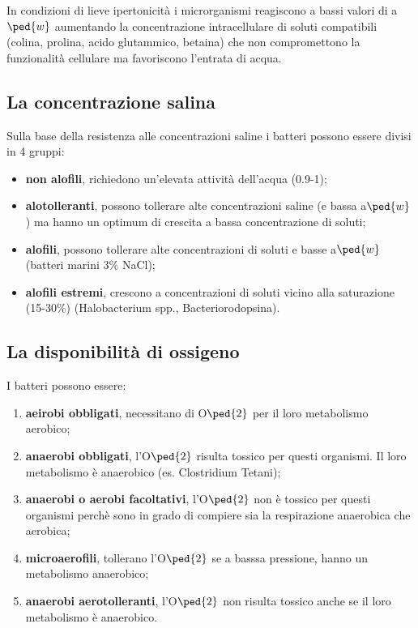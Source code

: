 \documentclass[11pt]{book}
\begin{document}
In condizioni di lieve ipertonicità i microrganismi reagiscono a bassi valori di a$\ped{w}$ aumentando la concentrazione intracellulare di soluti compatibili (colina, prolina, acido glutammico, betaina) che non compromettono la funzionalità cellulare ma favoriscono l’entrata di acqua.

\subsection{La concentrazione salina}
Sulla base della resistenza alle concentrazioni saline i batteri possono essere divisi in 4 gruppi:
\begin{itemize}
\item \textbf{non alofili}, richiedono un'elevata attività dell’acqua (0.9-1);
\item \textbf{alotolleranti}, possono tollerare alte concentrazioni saline (e bassa a$\ped{w}$) ma hanno un optimum di crescita a bassa concentrazione di soluti;
\item \textbf{alofili}, possono tollerare alte concentrazioni di soluti e basse a$\ped{w}$ (batteri marini 3$\%$ NaCl);
\item \textbf{alofili estremi}, crescono a concentrazioni di soluti vicino alla saturazione (15-30$\%$) (Halobacterium spp., Bacteriorodopsina).
\end{itemize}

\subsection{La disponibilità di ossigeno}
I batteri possono essere:
\begin{enumerate}
\item  \textbf{aeirobi obbligati}, necessitano di O$\ped{2}$ per il loro metabolismo aerobico;
\item \textbf{anaerobi obbligati}, l'O$\ped{2}$ risulta tossico per questi organismi. Il loro metabolismo è anaerobico (es. Clostridium Tetani);
\item \textbf{anaerobi o aerobi facoltativi}, l'O$\ped{2}$ non è tossico per questi organismi perchè sono in grado di compiere sia la respirazione anaerobica che aerobica;
\item \textbf{microaerofili}, tollerano l'O$\ped{2}$ se a basssa pressione, hanno un metabolismo anaerobico;
\item \textbf{anaerobi aerotolleranti}, l'O$\ped{2}$ non risulta tossico anche se il loro metabolismo è anaerobico.
\end{enumerate}
\end{document}
